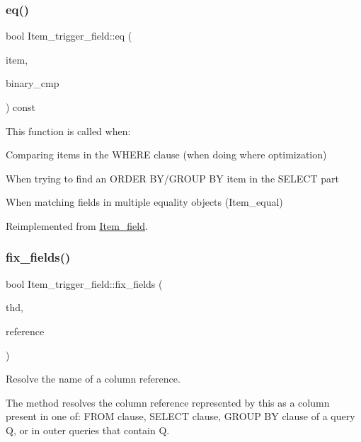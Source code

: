 \subsubsection{\texorpdfstring{eq()}{eq()}}
{\footnotesize\ttfamily bool Item\+\_\+trigger\+\_\+field\+::eq (\begin{DoxyParamCaption}\item[{const \mbox{\hyperlink{classItem}{Item}} $\ast$}]{item,  }\item[{bool}]{binary\+\_\+cmp }\end{DoxyParamCaption}) const\hspace{0.3cm}{\ttfamily [virtual]}}

This function is called when\+:
\begin{DoxyItemize}
\item Comparing items in the W\+H\+E\+RE clause (when doing where optimization)
\item When trying to find an O\+R\+D\+ER B\+Y/\+G\+R\+O\+UP BY item in the S\+E\+L\+E\+CT part
\item When matching fields in multiple equality objects (Item\+\_\+equal) 
\end{DoxyItemize}

Reimplemented from \mbox{\hyperlink{classItem__field_a009fb19dc742f706ec5c8bad9a6a0c2d}{Item\+\_\+field}}.

\mbox{\label{classItem__trigger__field_ae8c6fff3b15e017433a9103bce570187}} 
\subsubsection{\texorpdfstring{fix\+\_\+fields()}{fix\_fields()}}
{\footnotesize\ttfamily bool Item\+\_\+trigger\+\_\+field\+::fix\+\_\+fields (\begin{DoxyParamCaption}\item[{T\+HD $\ast$}]{thd,  }\item[{\mbox{\hyperlink{classItem}{Item}} $\ast$$\ast$}]{reference }\end{DoxyParamCaption})\hspace{0.3cm}{\ttfamily [virtual]}}

Resolve the name of a column reference.

The method resolves the column reference represented by \textquotesingle{}this\textquotesingle{} as a column present in one of\+: F\+R\+OM clause, S\+E\+L\+E\+CT clause, G\+R\+O\+UP BY clause of a query Q, or in outer queries that contain Q.


